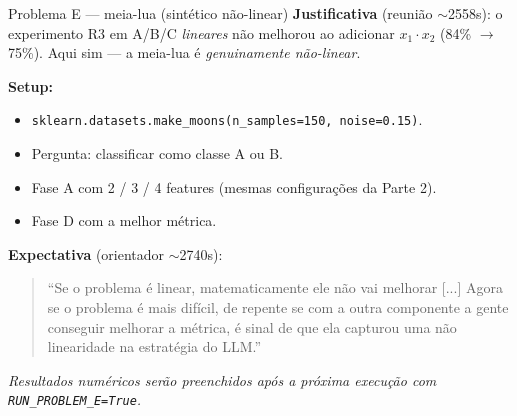 \documentclass[aspectratio=169,10pt]{beamer}
\begin{document}
\begin{frame}{Problema E --- meia-lua (sint\'etico n\~ao-linear)}
  \footnotesize
  \textbf{Justificativa} (reuni\~ao $\sim$2558s): o experimento R3 em A/B/C \emph{lineares} n\~ao melhorou ao adicionar $x_1 \cdot x_2$ (84\% $\to$ 75\%). Aqui sim --- a meia-lua \'e \emph{genuinamente n\~ao-linear}.
  \medskip

  \textbf{Setup:}
  \begin{itemize}
    \item \texttt{sklearn.datasets.make\_moons(n\_samples=150, noise=0.15)}.
    \item Pergunta: classificar como classe A ou B.
    \item Fase A com 2 / 3 / 4 features (mesmas configura\c{c}\~oes da Parte 2).
    \item Fase D com a melhor m\'etrica.
  \end{itemize}
  \medskip

  \textbf{Expectativa} (orientador $\sim$2740s):
  \begin{quote}
    ``Se o problema \'e linear, matematicamente ele n\~ao vai melhorar [...]
    Agora se o problema \'e mais dif\'icil, de repente se com a outra
    componente a gente conseguir melhorar a m\'etrica, \'e sinal de que ela
    capturou uma n\~ao linearidade na estrat\'egia do LLM.''
  \end{quote}
  \medskip

  \textit{\small Resultados num\'ericos ser\~ao preenchidos ap\'os a pr\'oxima execu\c{c}\~ao com \texttt{RUN\_PROBLEM\_E=True}.}
\end{frame}
\end{document}
